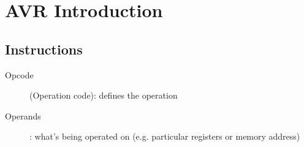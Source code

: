 \section{AVR Introduction}
\subsection{Instructions}
\begin{description}
	\item[Opcode] (Operation code): defines the operation
	\item[Operands]: what's being operated on (e.g. particular registers or memory address)
\end{description}